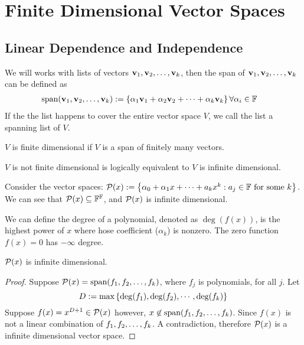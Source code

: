 \section{Finite Dimensional Vector Spaces}
\subsection{Linear Dependence and Independence} 
\begin{definition}
    We will works with lists of vectors ${\mathbf v}_1,{\mathbf v}_2, \ldots, {\mathbf v}_{k}$, then the span of ${\mathbf v}_1,{\mathbf v}_2, \ldots, {\mathbf v}_{k}$ can be defined as
    \begin{align*}
         \text{span} ({\mathbf v}_1,{\mathbf v}_2, \ldots, {\mathbf v}_{k}) &:= \left\{ \alpha_1\mathbf v_1 + \alpha_2 \mathbf v_2 + \cdots  + \alpha_k \mathbf v_k \right\}  \forall \alpha_i \in \mathbb F 
    \end{align*}
    If the the list happens to cover the entire vector space $V$, we call the list a spanning list of $V$.
\end{definition}
\begin{definition}
    $V$ is finite dimensional if $V$ is a span of finitely many vectors.
\end{definition}
\begin{remark}
    $V$ is not finite dimensional is logically equivalent to $V$ is infinite dimensional.
\end{remark}
\begin{example}
    Consider the vector spaces: $\mathcal P(x) : = \left\{ \alpha_0 + \alpha_1 x + \cdots + a_kx^k : a_j \in \mathbb F \text{ for some } k \right\}$. We can see that $\mathcal P(x) \subseteq \mathbb F^{\mathbb F}$, and $\mathcal P(x)$ is infinite dimensional.
\end{example}
\begin{definition}
    We can define the degree of a polynomial, denoted as $\deg(f(x))$, is the highest power of $x$ where hose coefficient ($\alpha_k$) is nonzero. The zero function $f(x) = 0$ has $-\infty$ degree. 
\end{definition} 
\begin{example}
    $\mathcal P(x)$ is infinite dimensional.
\end{example}
\begin{proof}
    Suppose $\mathcal P(x) = \text{span}({f}_1,{f}_2, \ldots, {f}_{k})$, where $f_j$ is polynomials, for all $j$. 
    Let \[D := \text{max}\left\{\deg(f_1), \deg(f_2), \cdots, \deg(f_k)\right\}\] Suppose $f(x) =  x^{D + 1} \in \mathcal P(x)$ however, $x \not\in \text{span}({f}_1,{f}_2, \ldots, {f}_{k})$. Since $f(x)$ is not a linear combination of ${f}_1,{f}_2, \ldots, {f}_{k}$. A contradiction, therefore $\mathcal P(x)$ is a infinite dimensional vector space.
\end{proof}
